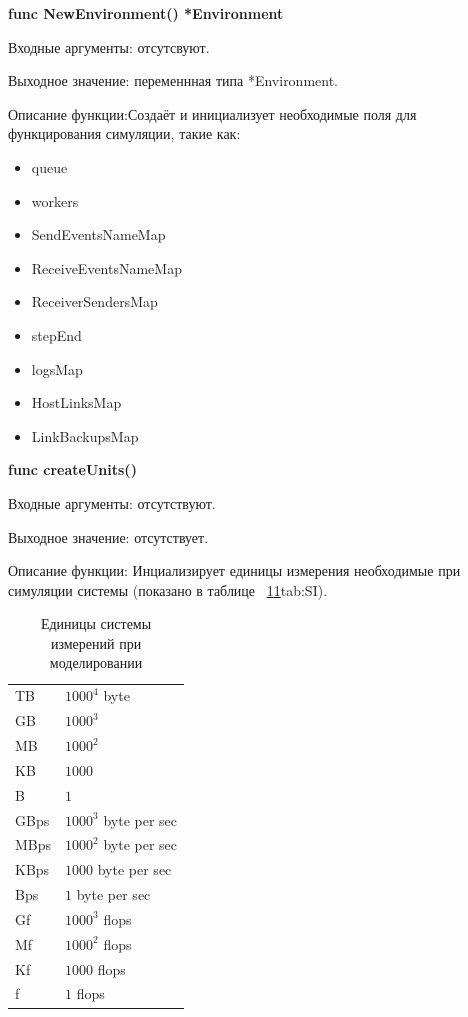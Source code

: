 \textbf{func NewEnvironment() *Environment}

Входные аргументы: отсутсвуют.

Выходное значение: переменнная типа *Environment.

Описание функции:Создаёт и инициализует необходимые поля для функцирования симуляции, такие как:
\begin{itemize}
\item 		queue           
\item 		workers        
\item 		SendEventsNameMap 
\item 		ReceiveEventsNameMap
\item 		ReceiverSendersMap
\item 		stepEnd
\item 		logsMap
\item 		HostLinksMap
\item 		LinkBackupsMap
\end{itemize}

\textbf{func createUnits()}

Входные аргументы: отсутствуют.

Выходное значение: отсутствует.

Описание функции: Инциализирует единицы измерения необходимые при симуляции системы (показано в таблице ~\ref{tab:SI}\ref{tab:SI}{tab:SI}).
\begin{table}[]
\centering
\caption{Единицы системы измерений при моделировании}
\label{tab:SI}
\begin{tabularx}{\textwidth}{|X|X|}
TB   & $1000^4$ byte         \\
GB   & $1000^3$              \\
MB   & $1000^2$              \\
KB   & $1000$                \\
B    & $1$                   \\
GBps & $1000^3$ byte per sec \\
MBps & $1000^2$ byte per sec \\
KBps & $1000$ byte per sec   \\
Bps  & $1$ byte per sec      \\
Gf   & $1000^3$ flops        \\
Mf   & $1000^2$ flops        \\
Kf   & $1000$ flops          \\
f    & $1$ flops            
\end{tabularx}
\end{table}

